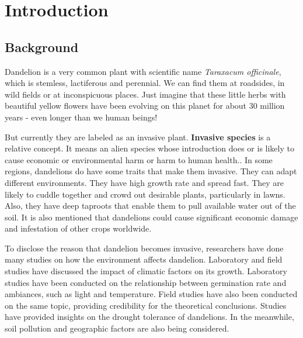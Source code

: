 \documentclass[12pt]{article}
\begin{document}
\maketitle
\tableofcontents

\section{Introduction}

	\subsection{Background}
	
	Dandelion is a very common plant with scientific name \textit{Taraxacum officinale}, which is stemless, lactiferous and perennial\autocite{stewart2002biology}.  We can find them at roadsides, in wild fields or at inconspicuous places.  Just imagine that these little herbs with beautiful yellow flowers have been evolving on this planet for about 30 million years\autocite{dandelionhistory} - even longer than we human beings!
	
	But currently they are labeled as an invasive plant.  \textbf{Invasive species} is a relative concept.  It means an alien species whose introduction does or is likely to cause economic or environmental harm or harm to human health.\autocite{defInvasive}.  In some regions, dandelions do have some traits that make them invasive.  They can adapt different environments.  They have high growth rate and spread fast. They are likely to cuddle together and crowd out desirable plants, particularly in lawns.  Also, they have deep taproots that enable them to pull available water out of the soil.  It is also mentioned that dandelions could cause significant economic damage and infestation of other crops worldwide\autocite{stewart2002biology}.
	
	To disclose the reason that dandelion becomes invasive, researchers have done many studies on how the environment affects dandelion.  Laboratory and field studies have discussed the impact of climatic factors on its growth. Laboratory studies have been conducted on the relationship between germination rate and ambiances, such as light and temperature\autocite{letchamo1996light}.  Field studies have also been conducted on the same topic, providing credibility for the theoretical conclusions\autocite{yoneda1991effects}.  Studies have provided insights on the drought tolerance of dandelions\autocite{brock2005drought}. In the meanwhile, soil pollution and geographic factors are also being considered\autocite{verhoeven2013geographic}.
	
\end{document}
